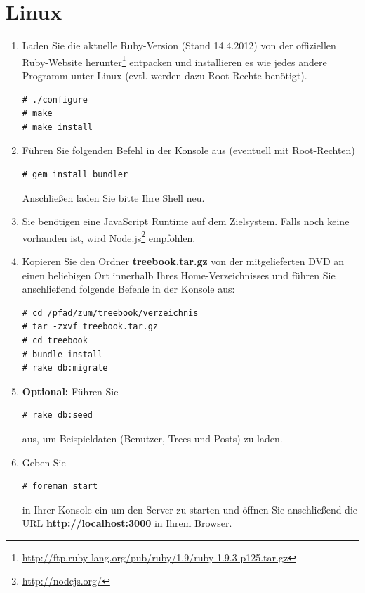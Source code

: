 \documentclass[10pt,a4paper]{book}
\begin{document}
\section{Linux}
\begin{enumerate}
\item Laden Sie die aktuelle Ruby-Version (Stand 14.4.2012) von der offiziellen Ruby-Website herunter\footnote{\href{http://ftp.ruby-lang.org/pub/ruby/1.9/ruby-1.9.3-p125.tar.gz}{http://ftp.ruby-lang.org/pub/ruby/1.9/ruby-1.9.3-p125.tar.gz}} entpacken und installieren es wie jedes andere Programm unter Linux (evtl. werden dazu Root-Rechte benötigt).
\lstset{language=bash}
\begin{lstlisting}
# ./configure
# make
# make install
\end{lstlisting}
\item Führen Sie folgenden Befehl in der Konsole aus (eventuell mit Root-Rechten)
\begin{lstlisting}
# gem install bundler
\end{lstlisting}
Anschließen laden Sie bitte Ihre Shell neu.
\item Sie benötigen eine JavaScript Runtime auf dem Zielsystem. Falls noch keine vorhanden ist, wird Node.js\footnote{\href{http://nodejs.org/}{http://nodejs.org/}} empfohlen.
\item Kopieren Sie den Ordner \textbf{treebook.tar.gz} von der mitgelieferten DVD an einen beliebigen Ort innerhalb Ihres Home-Verzeichnisses und führen Sie anschließend folgende Befehle in der Konsole aus:
\begin{lstlisting}
# cd /pfad/zum/treebook/verzeichnis
# tar -zxvf treebook.tar.gz
# cd treebook
# bundle install
# rake db:migrate
\end{lstlisting}
\item \textbf{Optional:} Führen Sie
\begin{lstlisting}
# rake db:seed
\end{lstlisting}
aus, um Beispieldaten (Benutzer, Trees und Posts) zu laden.
\item Geben Sie
\begin{lstlisting}
# foreman start
\end{lstlisting}
in Ihrer Konsole ein um den Server zu starten und öffnen Sie anschließend die URL \textbf{http://localhost:3000} in Ihrem Browser.
\end{enumerate}
\end{document}
